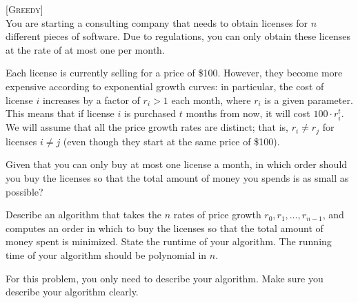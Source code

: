 \textsc{[Greedy]}
\\
You are starting a consulting company that needs to obtain licenses for
$n$ different pieces of software. Due to regulations, you can only
obtain these licenses at the rate of at most one per month.

Each license is currently selling for a price of \$100. However, they
become
 more expensive according to exponential growth curves: in
particular, the cost of license $i$ increases by a factor of $r_i > 1$ each month, where
$r_i$ is a given parameter. 
This means that if license $i$ 
is purchased $t$ months from
now, it will cost $100 \cdot r_i^t$. 
We will assume that all the price growth rates are
distinct; that is, $r_i \neq r_j$ for licenses 
$i \neq j$ (even though they start at the same
price of \$100).

Given that you can only buy at most one license
a month, in which order should you buy the licenses so that the total amount of
money you spends is as small as possible?

Describe an algorithm that takes the $n$ rates of price growth $r_0, r_1, \ldots, r_{n-1}$, and
computes an order in which to buy the licenses so that the total amount of
money spent is minimized.
State the runtime of your algorithm.
The running time of your algorithm should be
polynomial in $n$.

For this problem, you only need to describe your algorithm.
Make sure you describe your algorithm clearly.

